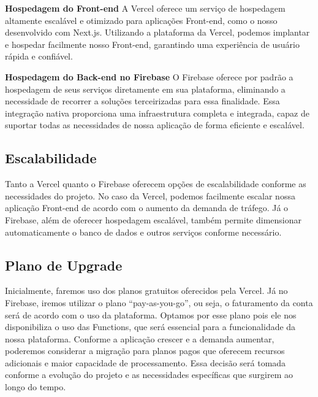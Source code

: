 \textbf{Hospedagem do Front-end} \newline
A Vercel oferece um serviço de hospedagem altamente escalável e otimizado para aplicações Front-end, como o nosso desenvolvido com Next.js. Utilizando a plataforma da Vercel, podemos implantar e hospedar facilmente nosso Front-end, garantindo uma experiência de usuário rápida e confiável.

\textbf{Hospedagem do Back-end no Firebase} \newline
O Firebase oferece por padrão a hospedagem de seus serviços diretamente em sua plataforma, eliminando a necessidade de recorrer a soluções terceirizadas para essa finalidade. Essa integração nativa proporciona uma infraestrutura completa e integrada, capaz de suportar todas as necessidades de nossa aplicação de forma eficiente e escalável.

\subsection{Escalabilidade}
Tanto a Vercel quanto o Firebase oferecem opções de escalabilidade conforme as necessidades do projeto. No caso da Vercel, podemos facilmente escalar nossa aplicação Front-end de acordo com o aumento da demanda de tráfego. Já o Firebase, além de oferecer hospedagem escalável, também permite dimensionar automaticamente o banco de dados e outros serviços conforme necessário.

\subsection{Plano de Upgrade}
Inicialmente, faremos uso dos planos gratuitos oferecidos pela Vercel. Já no Firebase, iremos utilizar o plano “pay-as-you-go”, ou seja, o faturamento da conta será de acordo com o uso da plataforma. Optamos por esse plano pois ele nos disponibiliza o uso das Functions, que será essencial para a funcionalidade da nossa plataforma.
Conforme a aplicação crescer e a demanda aumentar, poderemos considerar a migração para planos pagos que oferecem recursos adicionais e maior capacidade de processamento. Essa decisão será tomada conforme a evolução do projeto e as necessidades específicas que surgirem ao longo do tempo.